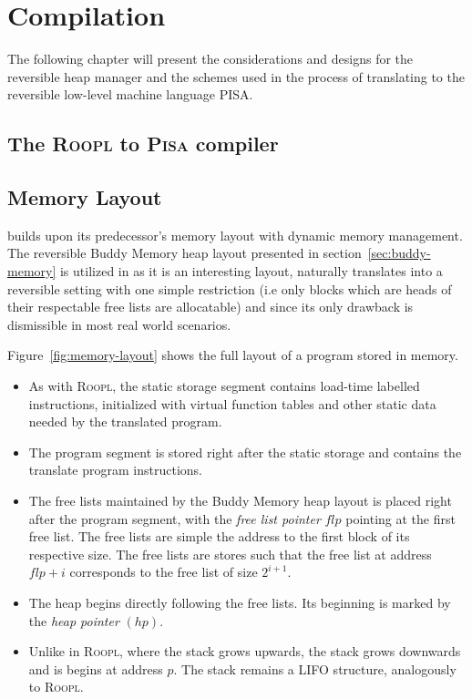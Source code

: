 \chapter{Compilation}
\label{chp:compilation}
The following chapter will present the considerations and designs for the reversible heap manager and the schemes used in the process of translating \rooplpp to the reversible low-level machine language \textsc{PISA}.

\section{The \textsc{Roopl} to \textsc{Pisa} compiler}

\section{\rooplpp Memory Layout}
\label{sec:rooplpp-memory-layout}
\rooplpp builds upon its predecessor's memory layout with dynamic memory management. The reversible Buddy Memory heap layout presented in section~\ref{sec:buddy-memory} is utilized in \rooplpp as it is an interesting layout, naturally translates into a reversible setting with one simple restriction (i.e only blocks which are heads of their respectable free lists are allocatable) and since its only drawback is dismissible in most real world scenarios.

Figure~\ref{fig:memory-layout} shows the full layout of a \rooplpp program stored in memory.

\begin{itemize}
    \item As with \textsc{Roopl}, the static storage segment contains load-time labelled  instructions, initialized with virtual function tables and other static data needed by the translated program.

    \item The program segment is stored right after the static storage and contains the translate \rooplpp program instructions.

    \item The free lists maintained by the Buddy Memory heap layout is placed right after the program segment, with the \textit{free list pointer} $flp$ pointing at the first free list. The free lists are simple the address to the first block of its respective size. The free lists are stores such that the free list at address $flp + i$ corresponds to the free list of size $2^{i+1}$.   

    \item The heap begins directly following the free lists. Its beginning is marked by the \textit{heap pointer} $(hp)$. 

    \item Unlike in \textsc{Roopl}, where the stack grows upwards, the \rooplpp stack grows downwards and is begins at address $p$. The stack remains a LIFO structure, analogously to \textsc{Roopl}.
\end{itemize}


